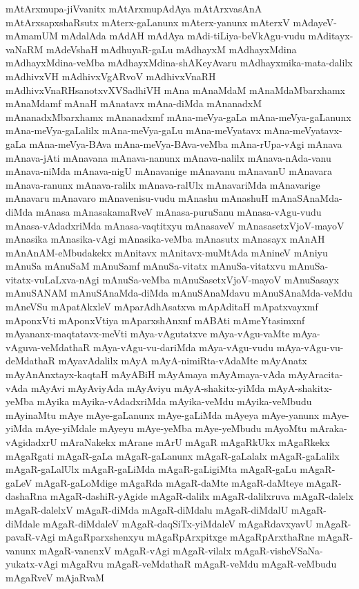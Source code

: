 {mAtArxmupa-jiVvanitx
mAtArxmupAdAya
mAtArxvasAnA
mAtArxsapxshaRsutx
mAterx-gaLanunx
mAterx-yanunx
mAterxV
mAdayeV-mAmamUM
mAdalAda
mAdAH
mAdAya
mAdi-tiLiya-beVkAgu-vudu
mAditayx-vaNaRM
mAdeVshaH
mAdhuyaR-gaLu
mAdhayxM
mAdhayxMdina
mAdhayxMdina-veMba
mAdhayxMdina-shAKeyAvaru
mAdhayxmika-mata-dalilx
mAdhivxVH
mAdhivxVgARvoV
mAdhivxVnaRH
mAdhivxVnaRHsanotxvXVSadhiVH
mAna
mAnaMdaM
mAnaMdaMbarxhamx
mAnaMdamf
mAnaH
mAnatavx
mAna-diMda
mAnanadxM
mAnanadxMbarxhamx
mAnanadxmf
mAna-meVya-gaLa
mAna-meVya-gaLanunx
mAna-meVya-gaLalilx
mAna-meVya-gaLu
mAna-meVyatavx
mAna-meVyatavx-gaLa
mAna-meVya-BAva
mAna-meVya-BAva-veMba
mAna-rUpa-vAgi
mAnava
mAnava-jAti
mAnavana
mAnava-nanunx
mAnava-nalilx
mAnava-nAda-vanu
mAnava-niMda
mAnava-nigU
mAnavanige
mAnavanu
mAnavanU
mAnavara
mAnava-ranunx
mAnava-ralilx
mAnava-ralUlx
mAnavariMda
mAnavarige
mAnavaru
mAnavaro
mAnavenisu-vudu
mAnashu
mAnashuH
mAnaSAnaMda-diMda
mAnasa
mAnasakamaRveV
mAnasa-puruSanu
mAnasa-vAgu-vudu
mAnasa-vAdadxriMda
mAnasa-vaqtitxyu
mAnasaveV
mAnasasetxVjoV-mayoV
mAnasika
mAnasika-vAgi
mAnasika-veMba
mAnasutx
mAnasayx
mAnAH
mAnAnAM-eMbudakekx
mAnitavx
mAnitavx-muMtAda
mAnineV
mAniyu
mAnuSa
mAnuSaM
mAnuSamf
mAnuSa-vitatx
mAnuSa-vitatxvu
mAnuSa-vitatx-vuLaLxva-nAgi
mAnuSa-veMba
mAnuSasetxVjoV-mayoV
mAnuSasayx
mAnuSANAM
mAnuSAnaMda-diMda
mAnuSAnaMdavu
mAnuSAnaMda-veMdu
mAneVSu
mApatAkxleV
mAparAdhAsatxva
mApAditaH
mApatxvayxmf
mAponxVti
mAponxVtiya
mAparxshAnxnf
mABAti
mAmeYtasimxnf
mAyananx-maqtatavx-meVti
mAya-vAgutatxve
mAya-vAgu-vaMte
mAya-vAguva-veMdathaR
mAya-vAgu-vu-dariMda
mAya-vAgu-vudu
mAya-vAgu-vu-deMdathaR
mAyavAdalilx
mAyA
mAyA-nimiRta-vAdaMte
mAyAnatx
mAyAnAnxtayx-kaqtaH
mAyABiH
mAyAmaya
mAyAmaya-vAda
mAyAracita-vAda
mAyAvi
mAyAviyAda
mAyAviyu
mAyA-shakitx-yiMda
mAyA-shakitx-yeMba
mAyika
mAyika-vAdadxriMda
mAyika-veMdu
mAyika-veMbudu
mAyinaMtu
mAye
mAye-gaLanunx
mAye-gaLiMda
mAyeya
mAye-yanunx
mAye-yiMda
mAye-yiMdale
mAyeyu
mAye-yeMba
mAye-yeMbudu
mAyoMtu
mAraka-vAgidadxrU
mAraNakekx
mArane
mArU
mAgaR
mAgaRkUkx
mAgaRkekx
mAgaRgati
mAgaR-gaLa
mAgaR-gaLanunx
mAgaR-gaLalalx
mAgaR-gaLalilx
mAgaR-gaLalUlx
mAgaR-gaLiMda
mAgaR-gaLigiMta
mAgaR-gaLu
mAgaR-gaLeV
mAgaR-gaLoMdige
mAgaRda
mAgaR-daMte
mAgaR-daMteye
mAgaR-dashaRna
mAgaR-dashiR-yAgide
mAgaR-dalilx
mAgaR-dalilxruva
mAgaR-dalelx
mAgaR-dalelxV
mAgaR-diMda
mAgaR-diMdalu
mAgaR-diMdalU
mAgaR-diMdale
mAgaR-diMdaleV
mAgaR-daqSiTx-yiMdaleV
mAgaRdavxyavU
mAgaR-pavaR-vAgi
mAgaRparxshenxyu
mAgaRpArxpitxge
mAgaRpArxthaRne
mAgaR-vanunx
mAgaR-vanenxV
mAgaR-vAgi
mAgaR-vilalx
mAgaR-visheVSaNa-yukatx-vAgi
mAgaRvu
mAgaR-veMdathaR
mAgaR-veMdu
mAgaR-veMbudu
mAgaRveV
mAjaRvaM
}
